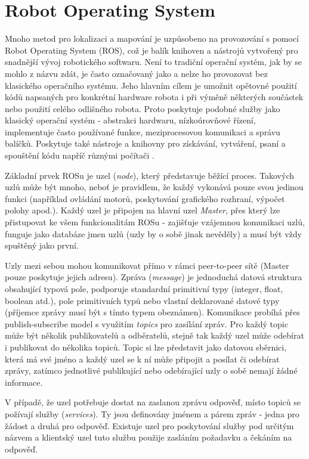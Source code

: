 \documentclass[12pt,a4paper]{report}
\begin{document}
\section{Robot Operating System}
Mnoho metod pro lokalizaci a mapování je uzpůsobeno na provozování s pomocí Robot Operating System (ROS), což je balík knihoven a nástrojů vytvořený pro snadnější vývoj robotického softwaru. Není to tradiční operační systém, jak by se mohlo z názvu zdát, je často označovaný jako  a nelze ho provozovat bez klasického operačního systému. Jeho hlavním cílem je umožnit opětovné použití kódů napsaných pro konkrétní hardware robota i při výměně některých součástek nebo použití celého odlišného robota. Proto poskytuje podobné služby jako klasický operační systém - abstrakci hardwaru, nízkoúrovňové řízení, implementuje často používané funkce, meziprocesovou komunikaci a správu balíčků. Poskytuje také nástroje a knihovny pro získávání, vytváření, psaní a spouštění kódu napříč různými počítači \cite{ROS}.

Základní prvek ROSu je uzel (\textit{node}), který představuje běžící proces. Takových uzlů může být mnoho, neboť je pravidlem, že každý vykonává pouze svou jedinou funkci (například ovládání motorů, poskytování grafického rozhraní, výpočet polohy apod.). Každý uzel je připojen na hlavní uzel \textit{Master}, přes který lze přistupovat ke všem funkcionalitám ROSu - zajišťuje vzájemnou komunikaci uzlů, funguje jako databáze jmen uzlů (uzly by o sobě jinak nevěděly) a musí být vždy spuštěný jako první. 

Uzly mezi sebou mohou komunikovat přímo v rámci peer-to-peer sítě (Master pouze poskytuje jejich adresu). Zpráva (\textit{message}) je jednoduchá datová struktura obsahující typová pole, podporuje standardní primitivní typy (integer, float, boolean atd.), pole primitivních typů nebo vlastní deklarované datové typy (příjemce zprávy musí být s tímto typem obeznámen). Komunikace probíhá přes publish-subscribe model s využitím \textit{topics} pro zasílání zpráv. Pro každý topic může být několik publikovatelů a odběratelů, stejně tak každý uzel může odebírat i publikovat do několika topiců. Topic si lze představit jako datovou sběrnici, která má své jméno a každý uzel se k ní může připojit a posílat či odebírat zprávy, zatímco jednotlivé publikující nebo odebírající uzly o sobě nemají žádné informace. 

V případě, že uzel potřebuje dostat na zaslanou zprávu odpověď, místo topiců se požívají služby (\textit{services}). Ty jsou definovány jménem a párem zpráv - jedna pro žádost a druhá pro odpověď. Existuje uzel pro poskytování služby pod určitým názvem a klientský uzel tuto službu použije zasláním požadavku a čekáním na odpověď.
\end{document}
